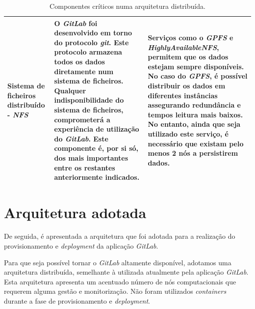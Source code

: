 \documentclass[12pt,a4paper]{article}
\begin{document}
\begin{table}[ht]
\begin{adjustbox}{width=1\textwidth}
\begin{tabular}{ | p{5cm} | p{6cm} | p{6cm} |}
        Sistema de ficheiros distribuído - \emph{NFS} & O \emph{GitLab} foi desenvolvido em torno do protocolo \emph{git}. Este protocolo armazena todos os dados diretamente num sistema de ficheiros. Qualquer indisponibilidade do sistema de ficheiros, comprometerá a experiência de utilização do \emph{GitLab}. Este componente é, por si só, dos mais importantes entre os restantes anteriormente indicados. & Serviços como o \textbf{\emph{GPFS}} e \textbf{\emph{HighlyAvailableNFS}}, permitem que os dados estejam sempre disponíveis. No caso do \emph{GPFS}, é possível distribuir os dados em diferentes instâncias assegurando redundância e tempos leitura mais baixos. No entanto, ainda que seja utilizado este serviço, é necessário que existam pelo menos 2 nós a persistirem dados.\\
        \hline
    \end{tabular}
    \end{adjustbox}
    \caption{Componentes críticos numa arquitetura distribuída.}
\end{table} 





\newpage
\section{Arquitetura adotada}

De seguida, é apresentada a arquitetura que foi adotada para a realização do provisionamento e \emph{deployment} da aplicação \emph{GitLab}.

Para que seja possível tornar o \emph{GitLab} altamente disponível, adotamos uma arquitetura distribuída, semelhante à utilizada atualmente pela aplicação \emph{GitLab}. Esta arquitetura apresenta um acentuado número de nós computacionais que requerem alguma gestão e monitorização. Não foram utilizados \emph{containers} durante a fase de provisionamento e \emph{deployment}.
\end{document}
